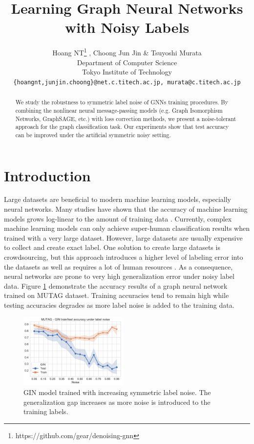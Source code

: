 \documentclass{article} %
\title{Learning Graph Neural Networks with Noisy Labels}
\author{Hoang NT\thanks{https://github.com/gear/denoising-gnn} , Choong Jun Jin \& Tsuyoshi Murata \\
Department of Computer Science\\
Tokyo Institute of Technology\\
\texttt{\{hoangnt,junjin.choong\}@net.c.titech.ac.jp, murata@c.titech.ac.jp} \\
}
\begin{document}
\maketitle

\begin{abstract}

We study the robustness to symmetric label noise of GNNs 
training procedures. By combining the nonlinear neural message-passing 
models (e.g. Graph Isomorphism Networks, GraphSAGE, etc.) with loss correction methods,
we present a noise-tolerant approach for the graph classification task.
Our experiments show that test accuracy can be improved 
under the artificial symmetric noisy setting. 

\end{abstract}

\section{Introduction}

Large datasets are beneficial to modern machine learning models, especially 
neural networks. Many studies have shown that the accuracy of machine learning
models grows log-linear to the amount of training data \citep{zhou2017brief}. 
Currently, complex machine learning models can only achieve super-human classification results when 
trained with a very large dataset. However, large datasets are usually expensive
to collect and create exact label. One solution to create large datasets is crowdsourcing, but 
this approach introduces a higher level of labeling error into the datasets as well as requires 
a lot of human resources \citep{georgakopoulos2016weakly}. As a consequence, neural networks 
are prone to very high generalization error under noisy label data.
Figure \ref{f:mutag_gin} demonstrate the accuracy results of a graph neural network
trained on MUTAG dataset. Training accuracies tend to remain high while testing
accuracies degrades as more label noise is added to the training data.

\begin{figure}
  \vspace{-2em}
   \begin{center}
      \includegraphics[width=0.48\textwidth]{figs/MUTAG_noisy_training}
   \end{center}
   \vspace{-1em}
  \caption{GIN model trained with increasing symmetric label noise. 
  The generalization gap increases as more noise is introduced to the training labels.}
  \label{f:mutag_gin}
  \vspace{-1em}
\end{figure}
\end{document}
